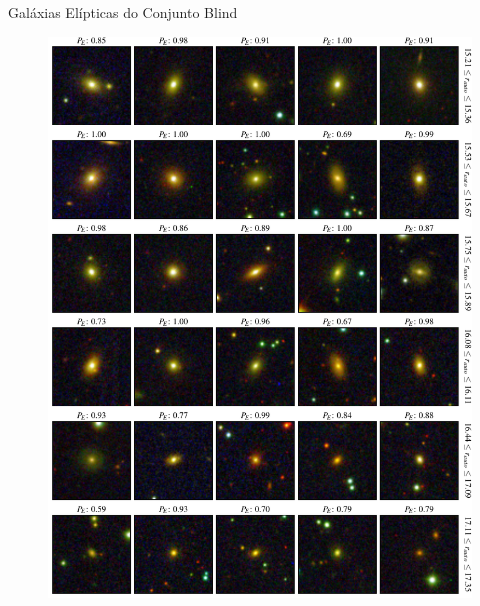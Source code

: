 \documentclass[10pt,xcolor=svgnames]{beamer}
\begin{document}
\begin{frame}{Galáxias Elípticas do Conjunto Blind}
\begin{minipage}{0.49\textwidth}
\begin{figure}
      \includegraphics[width=\linewidth]{figures/blind_preds_ellip_2.pdf}
    \end{figure}
  \end{minipage}
\end{frame}
\end{document}
